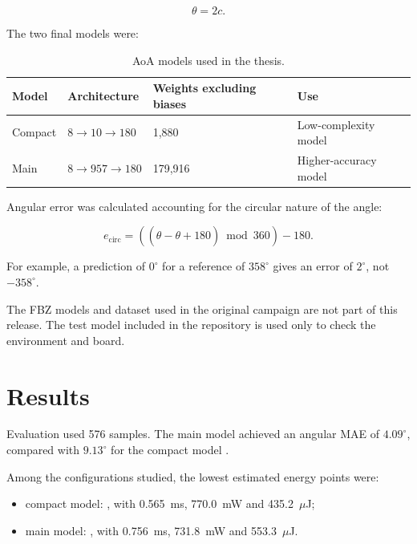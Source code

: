 \begin{equation}
\theta = 2c.
\end{equation}

The two final models were:

\begin{table}[H]
\centering
\caption{AoA models used in the thesis.}
\label{tab:tfg-models}
\begin{tabularx}{\textwidth}{@{}L{0.23\textwidth}L{0.28\textwidth}L{0.23\textwidth}Y@{}}
\toprule
\textbf{Model} & \textbf{Architecture} & \textbf{Weights excluding biases} & \textbf{Use} \\
\midrule
Compact &
$8\rightarrow10\rightarrow180$ &
1,880 &
Low-complexity model \\

Main &
$8\rightarrow957\rightarrow180$ &
179,916 &
Higher-accuracy model \\
\bottomrule
\end{tabularx}
\end{table}

Angular error was calculated accounting for the circular nature of the angle:

\begin{equation}
e_{\mathrm{circ}}
=
((\hat{\theta}-\theta+180)\bmod 360)-180.
\end{equation}

For example, a prediction of $0^\circ$ for a reference of $358^\circ$ gives an error
of $2^\circ$, not $-358^\circ$.

The FBZ models and dataset used in the original campaign are not part of this release.
The test model included in the repository is used only to check the environment and board.

\section{Results}

Evaluation used 576 samples. The main model achieved an angular MAE of $4.09^\circ$,
compared with $9.13^\circ$ for the compact model \cite{poveda_tfg_2026}.

Among the configurations studied, the lowest estimated energy points were:

\begin{itemize}
  \item compact model: , with 0.565~ms,
        770.0~mW and 435.2~$\mu$J;
  \item main model: , with 0.756~ms,
        731.8~mW and 553.3~$\mu$J.
\end{itemize}

